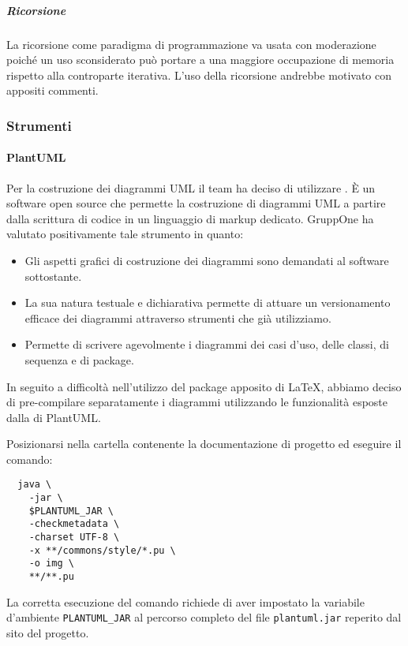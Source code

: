 \documentclass[../../norme-di-progetto.tex]{subfiles}
\begin{document}
\subparagraph{Ricorsione}%
\label{subp:ricorsione}
La ricorsione come paradigma di programmazione va usata con moderazione poiché un uso sconsiderato può portare a una maggiore occupazione di memoria rispetto alla controparte iterativa.
L'uso della ricorsione andrebbe motivato con appositi commenti.
\subsubsection{Strumenti}%
\label{subs:strumenti}

\paragraph{PlantUML}%
\label{par:plantuml}
Per la costruzione dei diagrammi UML il team ha deciso di utilizzare \@.
È un software open source che permette la costruzione di diagrammi UML a partire dalla scrittura di codice in un linguaggio di markup dedicato. GruppOne ha valutato positivamente tale strumento in quanto:

\begin{itemize}
  \item Gli aspetti grafici di costruzione dei diagrammi sono demandati al software sottostante.
  \item La sua natura testuale e dichiarativa permette di attuare un versionamento efficace dei diagrammi attraverso strumenti che già utilizziamo.
  \item Permette di scrivere agevolmente i diagrammi dei casi d'uso, delle classi, di sequenza e di package.
\end{itemize}

In seguito a difficoltà nell'utilizzo del package apposito di \LaTeX{}, abbiamo deciso di pre-compilare separatamente i diagrammi utilizzando le funzionalità esposte dalla  di PlantUML\@.

Posizionarsi nella cartella contenente la documentazione di progetto ed eseguire il comando:

\begin{verbatim}
  java \
    -jar \
    $PLANTUML_JAR \
    -checkmetadata \
    -charset UTF-8 \
    -x **/commons/style/*.pu \
    -o img \
    **/**.pu
\end{verbatim}

La corretta esecuzione del comando richiede di aver impostato la variabile d'ambiente \verb|PLANTUML_JAR| al percorso completo del file \verb|plantuml.jar| reperito dal sito del progetto.
\end{document}
